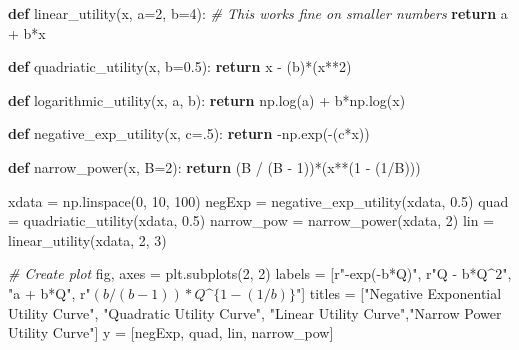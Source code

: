 \documentclass[]{tufte-book}
\newenvironment{Shaded}{}{}
\newcommand{\CommentTok}[1]{\textcolor[rgb]{0.38,0.63,0.69}{\textit{#1}}}
\newcommand{\ControlFlowTok}[1]{\textcolor[rgb]{0.00,0.44,0.13}{\textbf{#1}}}
\newcommand{\DecValTok}[1]{\textcolor[rgb]{0.25,0.63,0.44}{#1}}
\newcommand{\FloatTok}[1]{\textcolor[rgb]{0.25,0.63,0.44}{#1}}
\newcommand{\KeywordTok}[1]{\textcolor[rgb]{0.00,0.44,0.13}{\textbf{#1}}}
\newcommand{\NormalTok}[1]{#1}
\newcommand{\OperatorTok}[1]{\textcolor[rgb]{0.40,0.40,0.40}{#1}}
\newcommand{\StringTok}[1]{\textcolor[rgb]{0.25,0.44,0.63}{#1}}
\newcommand{\VerbatimStringTok}[1]{\textcolor[rgb]{0.25,0.44,0.63}{#1}}
\theoremstyle{definition}
\theoremstyle{definition}
\theoremstyle{definition}
\theoremstyle{remark}
\begin{document}
\begin{Shaded}
\begin{Highlighting}[]
\KeywordTok{def}\NormalTok{ linear\_utility(x, a}\OperatorTok{=}\DecValTok{2}\NormalTok{, b}\OperatorTok{=}\DecValTok{4}\NormalTok{):}
    \CommentTok{\# This works fine on smaller numbers}
    \ControlFlowTok{return}\NormalTok{ a }\OperatorTok{+}\NormalTok{ b}\OperatorTok{*}\NormalTok{x}

\KeywordTok{def}\NormalTok{ quadriatic\_utility(x, b}\OperatorTok{=}\FloatTok{0.5}\NormalTok{):}
    \ControlFlowTok{return}\NormalTok{ x }\OperatorTok{{-}}\NormalTok{ (b)}\OperatorTok{*}\NormalTok{(x}\OperatorTok{**}\DecValTok{2}\NormalTok{)}

\KeywordTok{def}\NormalTok{ logarithmic\_utility(x, a, b):}
    \ControlFlowTok{return}\NormalTok{ np.log(a) }\OperatorTok{+}\NormalTok{ b}\OperatorTok{*}\NormalTok{np.log(x)}

\KeywordTok{def}\NormalTok{ negative\_exp\_utility(x, c}\OperatorTok{=}\FloatTok{.5}\NormalTok{):}
    \ControlFlowTok{return} \OperatorTok{{-}}\NormalTok{np.exp(}\OperatorTok{{-}}\NormalTok{(c}\OperatorTok{*}\NormalTok{x))}

\KeywordTok{def}\NormalTok{ narrow\_power(x, B}\OperatorTok{=}\DecValTok{2}\NormalTok{):}
    \ControlFlowTok{return}\NormalTok{ (B }\OperatorTok{/}\NormalTok{ (B }\OperatorTok{{-}} \DecValTok{1}\NormalTok{))}\OperatorTok{*}\NormalTok{(x}\OperatorTok{**}\NormalTok{(}\DecValTok{1} \OperatorTok{{-}}\NormalTok{ (}\DecValTok{1}\OperatorTok{/}\NormalTok{B)))}

\NormalTok{xdata }\OperatorTok{=}\NormalTok{ np.linspace(}\DecValTok{0}\NormalTok{, }\DecValTok{10}\NormalTok{, }\DecValTok{100}\NormalTok{)}
\NormalTok{negExp }\OperatorTok{=}\NormalTok{ negative\_exp\_utility(xdata, }\FloatTok{0.5}\NormalTok{)}
\NormalTok{quad }\OperatorTok{=}\NormalTok{ quadriatic\_utility(xdata, }\FloatTok{0.5}\NormalTok{)}
\NormalTok{narrow\_pow }\OperatorTok{=}\NormalTok{ narrow\_power(xdata, }\DecValTok{2}\NormalTok{)}
\NormalTok{lin }\OperatorTok{=}\NormalTok{ linear\_utility(xdata, }\DecValTok{2}\NormalTok{, }\DecValTok{3}\NormalTok{)}

\CommentTok{\# Create plot}
\NormalTok{fig, axes }\OperatorTok{=}\NormalTok{ plt.subplots(}\DecValTok{2}\NormalTok{, }\DecValTok{2}\NormalTok{)}
\NormalTok{labels }\OperatorTok{=}\NormalTok{ [}\VerbatimStringTok{r"{-}exp({-}b*Q)"}\NormalTok{, }\VerbatimStringTok{r"Q {-} b*Q$\^{}2$"}\NormalTok{, }\StringTok{"a + b*Q"}\NormalTok{, }\VerbatimStringTok{r"$(b / (b{-}1))*Q\^{}\{1{-}(1/b)\}$"}\NormalTok{]}
\NormalTok{titles }\OperatorTok{=}\NormalTok{ [}\StringTok{"Negative Exponential Utility Curve"}\NormalTok{, }\StringTok{"Quadratic Utility Curve"}\NormalTok{, }
          \StringTok{"Linear Utility Curve"}\NormalTok{,}\StringTok{"Narrow Power Utility Curve"}\NormalTok{]}
\NormalTok{y }\OperatorTok{=}\NormalTok{ [negExp, quad, lin, narrow\_pow]}


\end{Highlighting}
\end{Shaded}
\end{document}
